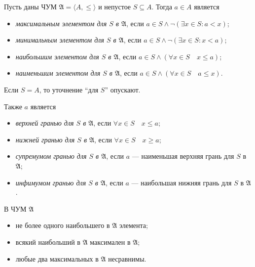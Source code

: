 \documentclass[12pt,a4paper]{article}
\begin{document}
    \begin{definition}
        Пусть даны ЧУМ $\mathfrak{A} = \langle A, \leqslant \rangle$ и непустое $S \subseteq A$. Тогда $a \in A$ является
        \begin{itemize}
            \item \emph{максимальным элементом для $S$ в $\mathfrak{A}$}, если $a \in S \wedge \neg(\exists x \in S: a < x)$;
            \item \emph{минимальным элементом для $S$ в $\mathfrak{A}$}, если $a \in S \wedge \neg(\exists x \in S: x < a)$;
            \item \emph{наибольшим элементом для $S$ в $\mathfrak{A}$}, если $a \in S \wedge (\forall x \in S\quad x \leqslant a)$;
            \item \emph{наименьшим элементом для $S$ в $\mathfrak{A}$}, если $a \in S \wedge (\forall x \in S\quad a \leqslant x)$.
        \end{itemize}

        Если $S = A$, то уточнение ``для $S$'' опускают.

        Также $a$ является
        \begin{itemize}
            \item \emph{верхней гранью для $S$ в $\mathfrak{A}$}, если $\forall x \in S\quad x \leqslant a$;
            \item \emph{нижней гранью для $S$ в $\mathfrak{A}$}, если $\forall x \in S\quad x \geqslant a$;
            \item \emph{супремумом гранью для $S$ в $\mathfrak{A}$}, если $a$ --- наименьшая верхняя грань для $S$ в $\mathfrak{A}$;
            \item \emph{инфимумом гранью для $S$ в $\mathfrak{A}$}, если $a$ --- наибольшая нижняя грань для $S$ в $\mathfrak{A}$.
        \end{itemize}
    \end{definition}

    \begin{statement}
        В ЧУМ $\mathfrak{A}$
        \begin{itemize}
            \item не более одного наибольшего в $\mathfrak{A}$ элемента;
            \item всякий наибольший в $\mathfrak{A}$ максимален в $\mathfrak{A}$;
            \item любые два максимальных в $\mathfrak{A}$ несравнимы.
        \end{itemize}
    \end{statement}
\end{document}
